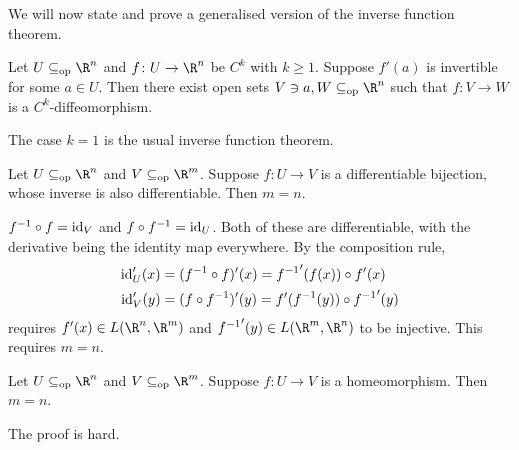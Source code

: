 We will now state and prove a generalised version of the
inverse function theorem.
\begin{theorem*} \label{thm:gen-ift}
    Let $U \subopeneq \R^n$ and $f\colon U \to \R^n$ be $C^k$ with
    $k \ge 1$.
    Suppose $f'(a)$ is invertible for some $a \in U$.
    Then there exist open sets $V \ni a, W \subopeneq \R^n$ such that
    $f\colon V \to W$ is a $C^k$-diffeomorphism.
\end{theorem*}
The case $k = 1$ is the usual inverse function theorem.

\begin{exercise*}
    Let $U \subopeneq \R^n$ and $V \subopeneq \R^m$.
    Suppose $f\colon U \to V$ is a differentiable bijection, whose inverse
    is also differentiable.
    Then $m = n$.
\end{exercise*}
\begin{solution}
    $f^{-1} \circ f = \operatorname{id}_V$ and $f \circ f^{-1} = \operatorname{id}_U$.
    Both of these are differentiable, with the derivative being the
    identity map everywhere.
    By the composition rule, \begin{align*}
        \operatorname{id}_U'(x) &= (f^{-1} \circ f)'(x) = {f^{-1}}'(f(x)) \circ f'(x) \\
        \operatorname{id}_V'(y) &= (f \circ f^{-1})'(y) = f'(f^{-1}(y)) \circ {f^{-1}}'(y)
    \end{align*} requires $f'(x) \in L(\R^n, \R^m)$
    and ${f^{-1}}'(y) \in L(\R^m, \R^n)$ to be injective.
    This requires $m = n$.
\end{solution}

\begin{fact}
    Let $U \subopeneq \R^n$ and $V \subopeneq \R^m$.
    Suppose $f\colon U \to V$ is a homeomorphism.
    Then $m = n$.
\end{fact}
The proof is hard.

